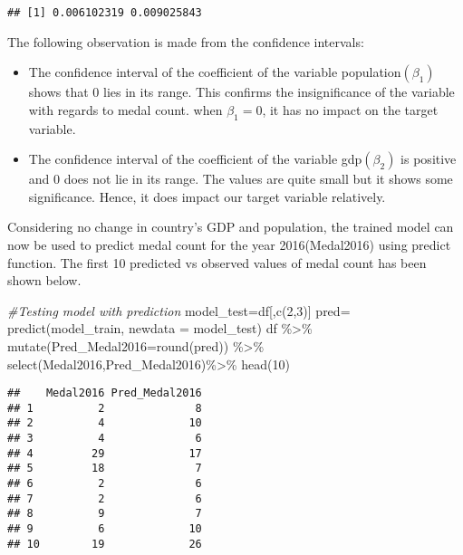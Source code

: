 \documentclass[
]{article}
\newenvironment{Shaded}{\begin{snugshade}}{\end{snugshade}}
\newcommand{\AttributeTok}[1]{\textcolor[rgb]{0.77,0.63,0.00}{#1}}
\newcommand{\CommentTok}[1]{\textcolor[rgb]{0.56,0.35,0.01}{\textit{#1}}}
\newcommand{\DecValTok}[1]{\textcolor[rgb]{0.00,0.00,0.81}{#1}}
\newcommand{\FunctionTok}[1]{\textcolor[rgb]{0.00,0.00,0.00}{#1}}
\newcommand{\NormalTok}[1]{#1}
\newcommand{\OtherTok}[1]{\textcolor[rgb]{0.56,0.35,0.01}{#1}}
\newcommand{\SpecialCharTok}[1]{\textcolor[rgb]{0.00,0.00,0.00}{#1}}
\providecommand{\tightlist}{%
  \setlength{\itemsep}{0pt}\setlength{\parskip}{0pt}}
\begin{document}
\begin{verbatim}
## [1] 0.006102319 0.009025843
\end{verbatim}

The following observation is made from the confidence intervals:

\begin{itemize}
\tightlist
\item
  The confidence interval of the coefficient of the variable
  population\((\beta_1)\) shows that \(0\) lies in its range. This
  confirms the insignificance of the variable with regards to medal
  count. when \(\beta_1=0\), it has no impact on the target variable.
\item
  The confidence interval of the coefficient of the variable
  gdp\((\beta_2)\) is positive and \(0\) does not lie in its range. The
  values are quite small but it shows some significance. Hence, it does
  impact our target variable relatively.
\end{itemize}

Considering no change in country's GDP and population, the trained model
can now be used to predict medal count for the year 2016(Medal2016)
using predict function. The first 10 predicted vs observed values of
medal count has been shown below.

\begin{Shaded}
\begin{Highlighting}[]
\CommentTok{\#Testing model with prediction}
\NormalTok{model\_test}\OtherTok{=}\NormalTok{df[,}\FunctionTok{c}\NormalTok{(}\DecValTok{2}\NormalTok{,}\DecValTok{3}\NormalTok{)]}
\NormalTok{pred}\OtherTok{=} \FunctionTok{predict}\NormalTok{(model\_train, }\AttributeTok{newdata =}\NormalTok{ model\_test)}
\NormalTok{df }\SpecialCharTok{\%\textgreater{}\%}
  \FunctionTok{mutate}\NormalTok{(}\AttributeTok{Pred\_Medal2016=}\FunctionTok{round}\NormalTok{(pred)) }\SpecialCharTok{\%\textgreater{}\%}
  \FunctionTok{select}\NormalTok{(Medal2016,Pred\_Medal2016)}\SpecialCharTok{\%\textgreater{}\%}
  \FunctionTok{head}\NormalTok{(}\DecValTok{10}\NormalTok{)}
\end{Highlighting}
\end{Shaded}

\begin{verbatim}
##    Medal2016 Pred_Medal2016
## 1          2              8
## 2          4             10
## 3          4              6
## 4         29             17
## 5         18              7
## 6          2              6
## 7          2              6
## 8          9              7
## 9          6             10
## 10        19             26
\end{verbatim}
\end{document}
